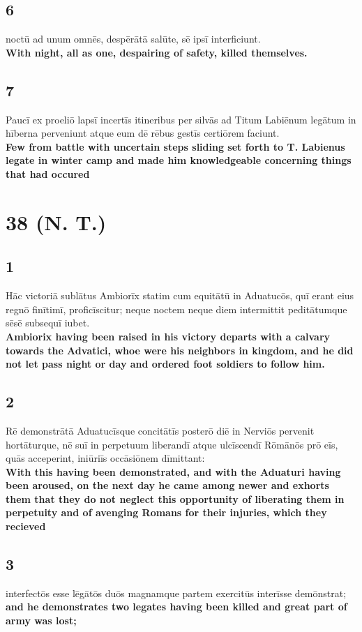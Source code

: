 \documentclass{article}
\begin{document}
\subsection*{6}
noctū ad unum omnēs, despērātā salūte, sē ipsī interficiunt.  \\
\textbf{With night, all as one, despairing of safety, killed themselves.}

\subsection*{7}
Paucī ex proeliō lapsī incertīs itineribus per silvās ad Titum Labiēnum legātum in hīberna perveniunt atque eum dē rēbus gestīs certiōrem faciunt. \\
\textbf{Few from battle with uncertain steps sliding set forth to T. Labienus legate in winter camp and made him knowledgeable concerning things that had occured}


\section*{38 (N. T.)}
\subsection*{1}
Hāc victoriā sublātus Ambiorīx statim cum equitātū in Aduatucōs, quī erant eius regnō finītimī, proficīscitur; neque noctem neque diem intermittit peditātumque sēsē subsequī iubet. \\
\textbf{Ambiorix having been raised in his victory departs with a calvary towards the Advatici, whoe were his neighbors in kingdom, and he did not let pass night or day and ordered foot soldiers to follow him.}

\subsection*{2}
Rē demonstrātā Aduatucīsque concitātīs posterō diē in Nerviōs pervenit hortāturque, nē suī in perpetuum liberandī atque ulcīscendī Rōmānōs prō eīs, quās acceperint, iniūriīs occāsiōnem dīmittant: \\
\textbf{With this having been demonstrated, and with the Aduaturi having been aroused, on the next day he came among newer and exhorts them that they do not neglect this opportunity of liberating them in perpetuity and of avenging Romans for their injuries, which they recieved}

\subsection*{3}
interfectōs esse lēgātōs duōs magnamque partem exercitūs interīsse demōnstrat;\\
\textbf{and he demonstrates two legates having been killed and great part of army was lost;}
\end{document}
